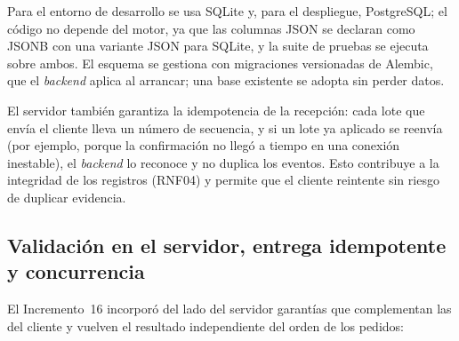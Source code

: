 Para el entorno de desarrollo se usa SQLite y, para el despliegue, PostgreSQL; el código no depende del motor, ya que las columnas JSON se declaran como JSONB con una variante JSON para SQLite, y la suite de pruebas se ejecuta sobre ambos. El esquema se gestiona con migraciones versionadas de Alembic, que el \textit{backend} aplica al arrancar; una base existente se adopta sin perder datos.

El servidor también garantiza la idempotencia de la recepción: cada lote que envía el cliente lleva un número de secuencia, y si un lote ya aplicado se reenvía (por ejemplo, porque la confirmación no llegó a tiempo en una conexión inestable), el \textit{backend} lo reconoce y no duplica los eventos. Esto contribuye a la integridad de los registros (RNF04) y permite que el cliente reintente sin riesgo de duplicar evidencia.

\subsection{Validación en el servidor, entrega idempotente y concurrencia}
\label{sec:impl_robustez}

El Incremento~16 incorporó del lado del servidor garantías que complementan las del cliente y vuelven el resultado independiente del orden de los pedidos:

